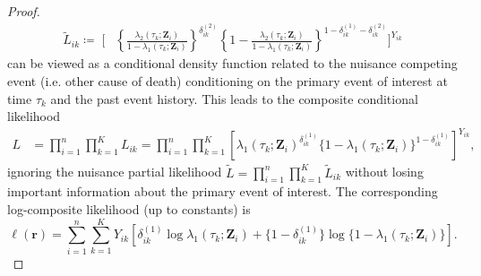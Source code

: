 \documentclass{article}
\theoremstyle{plain}
\theoremstyle{definition}
\theoremstyle{remark}
\begin{document}
\begin{proof}
\begin{align*}
    \tilde L_{ik}
    \coloneqq\;
    \Biggl[
    &\left\{\frac{\lambda_2(\tau_k;\bm Z_i)}
    {1-\lambda_1(\tau_k;\bm Z_i)}\right\}^{\delta_{ik}^{(2)}} 
    \left\{1-\frac{\lambda_2(\tau_k;\bm Z_i)}
    {1-\lambda_1(\tau_k;\bm Z_i)}\right\}^{1-\delta_{ik}^{(1)}-\delta_{ik}^{(2)}}
    \Biggr]^{Y_{ik}}
\end{align*}
can be viewed as a conditional density function related to the nuisance competing event (i.e. other cause of death) conditioning on the primary event of interest at time $\tau_k$ and the past event history.
This leads to the 
composite conditional likelihood
\begin{align}
   L
   & = 
   \prod_{i =1}^n \prod_{k=1}^{K}  L_{ik} = 
   \prod_{i =1}^n \prod_{k=1}^{K} \left[\lambda_1(\tau_k;\bm Z_i)^{\delta_{ik}^{(1)}} \{1-\lambda_1(\tau_k;\bm Z_i)\}^{1-\delta_{ik}^{(1)}}\right]^{Y_{ik}}, \nonumber
\end{align}
 ignoring the nuisance partial likelihood $\tilde L=  \prod_{i =1}^n \prod_{k=1}^{K} \tilde L_{ik}$ without losing important information about the primary event of interest. The corresponding log-composite likelihood (up to constants) is
\begin{equation}
\ell(\bm r)
=
\sum_{i=1}^n\sum_{k=1}^K
Y_{ik}\left[
\delta_{ik}^{(1)}\log\lambda_1(\tau_k;\bm Z_i)
+\{1-\delta_{ik}^{(1)}\}\log\{1-\lambda_1(\tau_k;\bm Z_i)\}
\right].
\label{eq:collapsed-loglik}
\end{equation} 
\end{proof}

\end{document}
